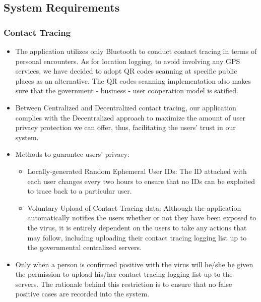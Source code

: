   \subsection{System Requirements}
    \subsubsection{Contact Tracing}
      \begin{itemize}
        \item The application utilizes only Bluetooth to conduct contact tracing in terms of personal encounters. As for location logging, to avoid involving any GPS services, we have decided to adopt QR codes scanning at specific public places as an alternative. The QR codes scanning implementation also makes sure that the government - business - user cooperation model is satified.
        \item Between Centralized and Decentralized contact tracing, our application complies with the Decentralized approach to maximize the amount of user privacy protection we can offer, thus, facilitating the users' trust in our system.
        \item Methods to guarantee users' privacy:
          \begin{itemize}
            \item Locally-generated Random Ephemeral User IDs: The ID attached with each user changes every two hours to ensure that no IDs can be exploited to trace back to a particular user.
            \item Voluntary Upload of Contact Tracing data: Although the application automatically notifies the users whether or not they have been exposed to the virus, it is entirely dependent on the users to take any actions that may follow, including uploading their contact tracing logging list up to the governmental centralized servers.
          \end{itemize}
        \item Only when a person is confirmed positive with the virus will he/she be given the permission to upload his/her contact tracing logging list up to the servers. The rationale behind this restriction is to ensure that no false positive cases are recorded into the system.
      \end{itemize}
    
